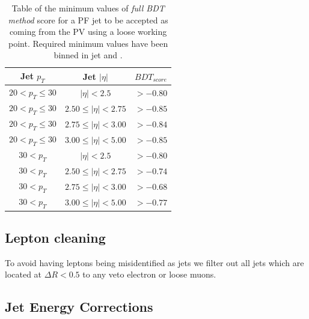 \begin{table}[!htb]
\centering
\begin{tabular}{|c|c|c|}
\hline
Jet $p_{T}$          & Jet $|\eta|$              & $BDT_{score}$ \\
\hline \hline
$20 < p_{T} \leq 30$ & $|\eta| < 2.5$            & $> -0.80$ \\
$20 < p_{T} \leq 30$ & $2.50 \leq |\eta| < 2.75$ & $> -0.85$ \\
$20 < p_{T} \leq 30$ & $2.75 \leq |\eta| < 3.00$ & $> -0.84$ \\
$20 < p_{T} \leq 30$ & $3.00 \leq |\eta| < 5.00$ & $> -0.85$ \\
$30 < p_{T}$         & $|\eta| < 2.5$            & $> -0.80$ \\
$30 < p_{T}$         & $2.50 \leq |\eta| < 2.75$ & $> -0.74$ \\
$30 < p_{T}$         & $2.75 \leq |\eta| < 3.00$ & $> -0.68$ \\
$30 < p_{T}$         & $3.00 \leq |\eta| < 5.00$ & $> -0.77$ \\
\hline
\end{tabular}
\caption{Table of the minimum values of \textit{full \gls{BDT} method} score for a \gls{PF} jet to be accepted as coming from the \gls{PV} using a loose working point. Required minimum values have been binned in jet \pt and \eta.}
\label{TABLE:EventReconstructionAndSimulation_PileupJetIDFullBDTLooseWorkingPoint}
\end{table}

\subsection{Lepton cleaning}
\label{SECTION:EventReconstructionAndSimulation_Jets_LeptonCleaning}


To avoid having leptons being misidentified as jets we filter out all jets which are located at $\Delta R < 0.5$ to any veto electron or loose muons.

\subsection{Jet Energy Corrections}
\label{SECTION:EventReconstructionAndSimulation_Jets_JetEnergyCorrections}

